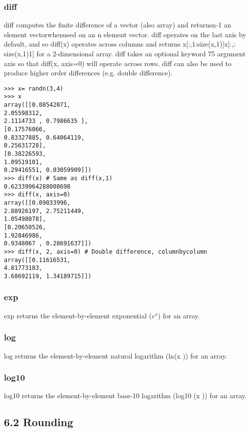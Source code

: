 \subsubsection*{diff}
diff computes the finite difference of a vector (also array) and returnsn-1 an element vectorwhenused on
an n element vector. diff operates on the last axis by default, and so diff(x) operates across columns and
returns x[:,1:size(x,1)]x[:,:
size(x,1)1]
for a 2-dimensional array. diff takes an optional keyword
75
argument axis so that diff(x, axis=0) will operate across rows. diff can also be used to produce higher
order differences (e.g. double difference).
\begin{framed}
\begin{verbatim}>>> x= randn(3,4)
>>> x
array([[0.08542071,
2.05598312,
2.1114733 , 0.7986635 ],
[0.17576066,
0.83327885, 0.64064119,
0.25631728],
[0.38226593,
1.09519101,
0.29416551, 0.03059909]])
>>> diff(x) # Same as diff(x,1)
0.62339964288008698
>>> diff(x, axis=0)
array([[0.09033996,
2.88926197, 2.75211449,
1.05498078],
[0.20650526,
1.92846986,
0.9348067 , 0.28691637]])
>>> diff(x, 2, axis=0) # Double difference, columnbycolumn
array([[0.11616531,
4.81773183,
3.68692119, 1.34189715]])
\end{verbatim}
\end{framed}
\subsubsection*{exp}
exp returns the element-by-element exponential ($e^x$) for an array.
\subsubsection*{log}
log returns the element-by-element natural logarithm (ln(x )) for an array.
\subsubsection*{log10}
log10 returns the element-by-element base-10 logarithm (log10 (x )) for an array.

\subsection{6.2 Rounding}
